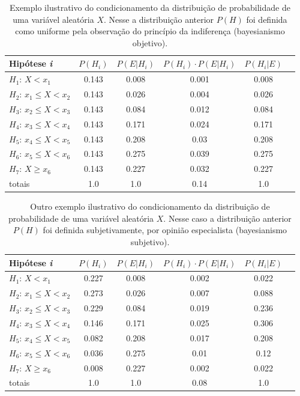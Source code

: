 \documentclass[./main.tex]{subfiles}
\begin{document}
\begin{table}[ht]
    \centering	
    \small
    \begin{tabular}{ l c c c c c } %
        \textbf{Hipótese \textit{i}} & \textbf{$P(H_i)$} & \textbf{$P(E | H_i)$} & \textbf{$P(H_i) \cdot P(E | H_i)$} & \textbf{$P(H_i | E)$}\\ 
        \hline
        $H_1$: $X < x_1$ & 0.143 & 0.008 & 0.001 & 0.008\\ 
        $H_2$: $x_1 \leq X < x_2$ & 0.143 & 0.026 & 0.004 & 0.026\\ 
        $H_3$: $x_2 \leq X < x_3$ & 0.143 & 0.084 & 0.012 & 0.084\\ 
        $H_4$: $x_3 \leq X < x_4$ & 0.143 & 0.171 & 0.024 & 0.171\\ 
        $H_5$: $x_4 \leq X < x_5$ & 0.143 & 0.208 & 0.03 & 0.208\\ 
        $H_6$: $x_5 \leq X < x_6$ & 0.143 & 0.275 & 0.039 & 0.275\\ 
        $H_7$: $X \geq x_6$ & 0.143 & 0.227 & 0.032 & 0.227\\ 
        \hline
        totais & 1.0 & 1.0 & 0.14 & 1.0\\
    \end{tabular}
    \caption[Exemplo condicionamento objetivo]{
    Exemplo ilustrativo do condicionamento da distribuição de probabilidade de uma variável aleatória $X$. Nesse a distribuição anterior $P(H)$ foi definida como uniforme pela observação do princípio da indiferença (bayesianismo objetivo).
    }
    \label{tbl:objective}
\end{table} 
\begin{table}[ht]
    \centering	
    \small
    \begin{tabular}{ l  c  c  c  c c} %
        \textbf{Hipótese \textit{i}} & \textbf{$P(H_i)$} & \textbf{$P(E | H_i)$} & \textbf{$P(H_i) \cdot P(E | H_i)$} & \textbf{$P(H_i | E)$}\\ 
        \hline
        $H_1$: $X < x_1$ & 0.227 & 0.008 & 0.002 & 0.022\\ 
        $H_2$: $x_1 \leq X < x_2$ & 0.273 & 0.026 & 0.007 & 0.088\\ 
        $H_3$: $x_2 \leq X < x_3$ & 0.229 & 0.084 & 0.019 & 0.236\\ 
        $H_4$: $x_3 \leq X < x_4$ & 0.146 & 0.171 & 0.025 & 0.306\\ 
        $H_5$: $x_4 \leq X < x_5$ & 0.082 & 0.208 & 0.017 & 0.208\\ 
        $H_6$: $x_5 \leq X < x_6$ & 0.036 & 0.275 & 0.01 & 0.12\\ 
        $H_7$: $X \geq x_6$ & 0.008 & 0.227 & 0.002 & 0.022\\ 
        \hline
        totais & 1.0 & 1.0 & 0.08 & 1.0\\
    \end{tabular}
    \caption[Exemplo de condicionamento subjetivo]{
    Outro exemplo ilustrativo do condicionamento da distribuição de probabilidade de uma variável aleatória $X$. Nesse caso a distribuição anterior $P(H)$ foi definida subjetivamente, por opinião especialista (bayesianismo subjetivo).
    }
    \label{tbl:subjective}
\end{table}
\end{document}
